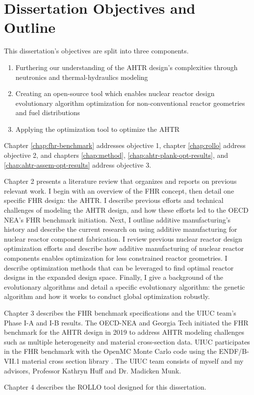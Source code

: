 \section{Dissertation Objectives and Outline}
This dissertation's objectives are split into three components. 
\begin{enumerate}
    \item Furthering our understanding of the \gls{AHTR} design's complexities 
    through neutronics and thermal-hydraulics modeling 
    \item Creating an open-source tool which enables nuclear reactor design 
    evolutionary algorithm optimization for non-conventional reactor geometries and fuel 
    distributions
    \item Applying the optimization tool to optimize the \gls{AHTR}
\end{enumerate}
Chapter \ref{chap:fhr-benchmark} addresses objective 1, chapter \ref{chap:rollo} 
address objective 2, and chapters \ref{chap:method}, \ref{chap:ahtr-plank-opt-results}, 
and \ref{chap:ahtr-assem-opt-results} address objective 3. 

Chapter 2 presents a literature review that organizes and reports on previous 
relevant work. 
I begin with an overview of the \gls{FHR} concept, then detail one specific 
\gls{FHR} design: the \gls{AHTR}. 
I describe previous efforts and technical challenges of modeling the \gls{AHTR} design, 
and how these efforts led to the \gls{OECD} \gls{NEA}'s \gls{FHR} benchmark initiation.
Next, I outline additive manufacturing's history and describe the current 
research on using additive manufacturing for nuclear reactor component fabrication. 
I review previous nuclear reactor design optimization efforts and describe how 
additive manufacturing of nuclear reactor components enables optimization for 
less constrained reactor geometries. 
I describe optimization methods that can be leveraged to find optimal reactor 
designs in the expanded design space.
Finally, I give a background of the evolutionary algorithms and detail a specific 
evolutionary algorithm: the genetic algorithm and how it works to conduct global 
optimization robustly.

Chapter 3 describes the \gls{FHR} benchmark specifications and the \gls{UIUC} team's 
Phase I-A and I-B results.
The \gls{OECD}-\gls{NEA} and \gls{Georgia Tech} initiated the \gls{FHR} 
benchmark for the \gls{AHTR} design in 2019 \cite{petrovic_benchmark_2021} 
to address \gls{AHTR} modeling challenges such as multiple heterogeneity and 
material cross-section data. 
\gls{UIUC} participates in the \gls{FHR} benchmark with the OpenMC Monte Carlo code 
\cite{romano_openmc_2013} using the ENDF/B-VII.1 material cross section library 
\cite{chadwick_endf/b-vii.1_2011}.
The \gls{UIUC} team consists of myself and my advisors, Professor Kathryn Huff and Dr.
Madicken Munk. 

Chapter 4 describes the \gls{ROLLO} tool designed for this dissertation. 